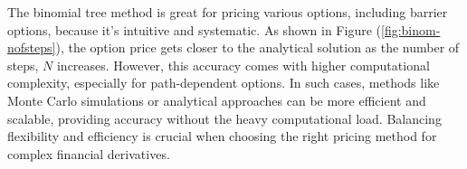 The binomial tree method is great for pricing various options, including barrier options, because it's intuitive and systematic. As shown in Figure (\ref{fig:binom-nofsteps}), the option price gets closer to the analytical solution as the number of steps, $N$ increases. However, this accuracy comes with higher computational complexity, especially for path-dependent options. In such cases, methods like Monte Carlo simulations or analytical approaches can be more efficient and scalable, providing accuracy without the heavy computational load. Balancing flexibility and efficiency is crucial when choosing the right pricing method for complex financial derivatives.
